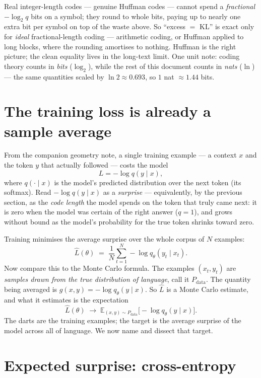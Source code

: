 \documentclass[11pt]{article}
\begin{document}
\begin{insight}
Real integer-length codes --- genuine Huffman codes --- cannot spend a \emph{fractional}
$-\log_2 q$ bits on a symbol; they round to whole bits, paying up to nearly one extra bit per
symbol on top of the waste above. So ``excess $=$ KL'' is exact only for \emph{ideal}
fractional-length coding --- arithmetic coding, or Huffman applied to long blocks, where the
rounding amortises to nothing. Huffman is the right picture; the clean equality lives in the
long-text limit. One unit note: coding theory counts in \emph{bits} ($\log_2$), while the rest
of this document counts in \emph{nats} ($\ln$) --- the same quantities scaled by
$\ln 2 \approx 0.693$, so $1$ nat $\approx 1.44$ bits.
\end{insight}

\section{The training loss is already a sample average}

From the companion geometry note, a single training example --- a context $x$ and the token
$y$ that actually followed --- costs the model
\[
  L = -\log q(y \mid x),
\]
where $q(\cdot \mid x)$ is the model's predicted distribution over the next token (its
softmax). Read $-\log q(y\mid x)$ as a \emph{surprise} --- equivalently, by the previous
section, as the \emph{code length} the model spends on the token that truly came next: it is
zero when the model was certain of the right answer ($q = 1$), and grows without bound as the
model's probability for the true token shrinks toward zero.

Training minimises the average surprise over the whole corpus of $N$ examples:
\[
  \widehat{L}(\theta) \;=\; \frac{1}{N}\sum_{t=1}^{N} -\log q_\theta(y_t \mid x_t).
\]
Now compare this to the Monte Carlo formula. The examples $(x_t, y_t)$ are
\emph{samples drawn from the true distribution of language}, call it $P_{\text{data}}$. The
quantity being averaged is $g(x,y) = -\log q_\theta(y\mid x)$. So $\widehat{L}$ is a Monte
Carlo estimate, and what it estimates is the expectation
\[
  \widehat{L}(\theta) \;\longrightarrow\;
  \mathbb{E}_{(x,y)\sim P_{\text{data}}}\!\bigl[-\log q_\theta(y\mid x)\bigr].
\]
The darts are the training examples; the target is the average surprise of the model across
all of language. We now name and dissect that target.

\section{Expected surprise: cross-entropy}
\end{document}
